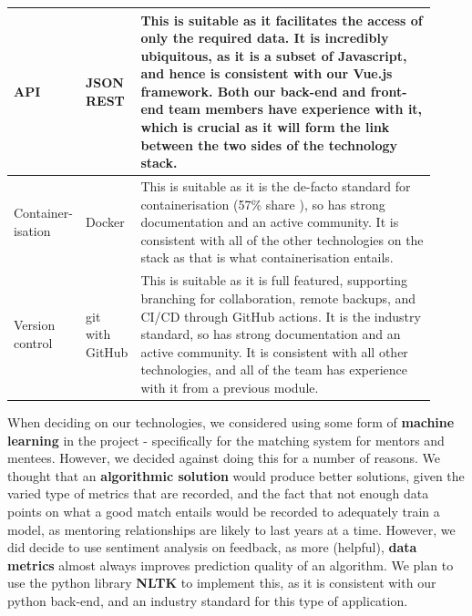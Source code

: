 \documentclass[10pt]{article}
\begin{document}
\begin{longtable}{|p{0.085\linewidth}|p{0.09\linewidth}|p{0.75\linewidth}|}
    API
    &
    JSON REST
    &
    This is suitable as it facilitates the access of only the required data. It
    is incredibly ubiquitous, as it is a subset of Javascript, and hence is
    consistent with our Vue.js framework. Both our back-end and front-end team
    members have experience with it, which is crucial as it will form the link
    between the two sides of the technology stack.
    \\ \hline

    Container- isation
    &
    Docker \cite{Docker}
    &
    This is suitable as it is the de-facto standard for containerisation (57\% share \cite{containerTools}),
    so has strong documentation and an active community. It is consistent with
    all of the other technologies on the stack as that is what containerisation
    entails. \\ \hline

    Version control
    &
    git with GitHub
    &
    This is suitable as it is full featured, supporting branching for collaboration,
    remote backups, and CI/CD through GitHub actions. It is the industry
    standard, so has strong documentation and an active community. It is
    consistent with all other technologies, and all of the team has experience
    with it from a previous module.
    \\ \hline

\end{longtable}

When deciding on our technologies, we considered using some form of
\textbf{machine learning} in the project - specifically for the matching system
for mentors and mentees. However, we decided against doing this for a number of
reasons. We thought that an \textbf{algorithmic solution} would produce better
solutions, given the varied type of metrics that are recorded, and the fact that
not enough data points on what a good match entails would be recorded to
adequately train a model, as mentoring relationships are likely to last years at
a time. However, we did decide to use sentiment analysis on feedback, as more
(helpful), \textbf{data metrics} almost always improves prediction quality of an
algorithm. We plan to use the python library \textbf{NLTK} \cite{NLTK} to
implement this, as it is consistent with our python back-end, and an industry
standard for this type of application.
\end{document}
